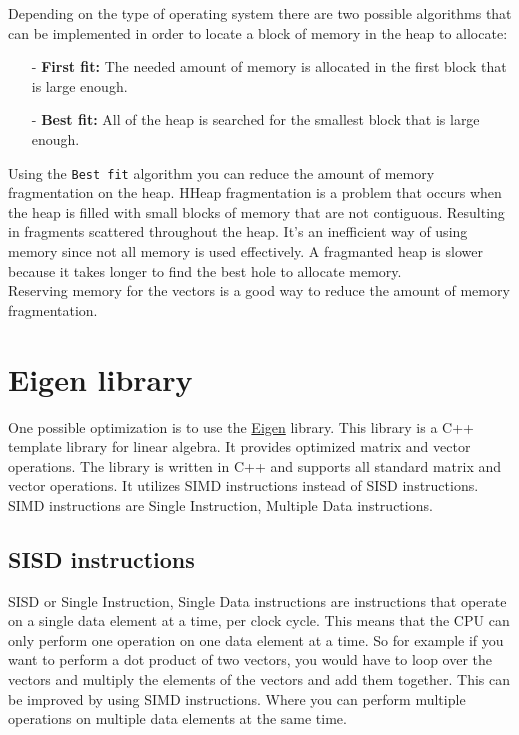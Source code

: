 \documentclass[twoside]{article}
\begin{document}
Depending on the type of operating system there are two possible algorithms that can be implemented in order to locate a block of memory in the heap to allocate\cite{MemoryAlloc-no-date}:
\begin{itemize}
  \setlength\itemsep{0em}
  \item[-] \textbf{First fit:} The needed amount of memory is allocated in the first block that is large enough.
  \item[-] \textbf{Best fit:} All of the heap is searched for the smallest block that is large enough.
\end{itemize}

Using the \texttt{Best fit} algorithm you can reduce the amount of memory fragmentation on the heap.
HHeap fragmentation is a problem that occurs when the heap is filled with small blocks of memory that are not contiguous.
Resulting in fragments scattered throughout the heap. It's an inefficient way of using memory since not all memory is used effectively.
A fragmanted heap is slower because it takes longer to find the best hole to allocate memory. \\

Reserving memory for the vectors is a good way to reduce the amount of memory fragmentation.

\newpage
\section{Eigen library}
One possible optimization is to use the \href{https://eigen.tuxfamily.org/dox/}{Eigen} library. This library is a C++ template library for linear algebra.
It provides optimized matrix and vector operations. The library is written in C++ and supports all standard matrix and vector operations.
It utilizes SIMD instructions instead of SISD instructions. SIMD instructions are Single Instruction, Multiple Data instructions.

\subsection{SISD instructions}
SISD or Single Instruction, Single Data instructions are instructions that operate on a single data element at a time, per clock cycle.
This means that the CPU can only perform one operation on one data element at a time. So for example if you want to perform a dot product of two vectors,
you would have to loop over the vectors and multiply the elements of the vectors and add them together. This can be improved by using SIMD instructions.
Where you can perform multiple operations on multiple data elements at the same time.
\end{document}
